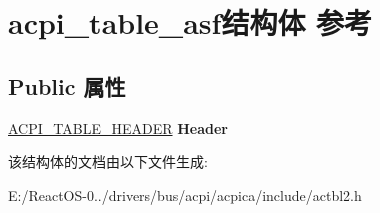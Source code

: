 \hypertarget{structacpi__table__asf}{}\section{acpi\+\_\+table\+\_\+asf结构体 参考}
\label{structacpi__table__asf}
\subsection*{Public 属性}
\begin{DoxyCompactItemize}
\item 
\mbox{\label{structacpi__table__asf_a1076b1c69540d56c556e6fab1bc842ef}} 
\hyperlink{structacpi__table__header}{A\+C\+P\+I\+\_\+\+T\+A\+B\+L\+E\+\_\+\+H\+E\+A\+D\+ER} {\bfseries Header}
\end{DoxyCompactItemize}


该结构体的文档由以下文件生成\+:\begin{DoxyCompactItemize}
\item 
E\+:/\+React\+O\+S-\/0../drivers/bus/acpi/acpica/include/actbl2.\+h\end{DoxyCompactItemize}
